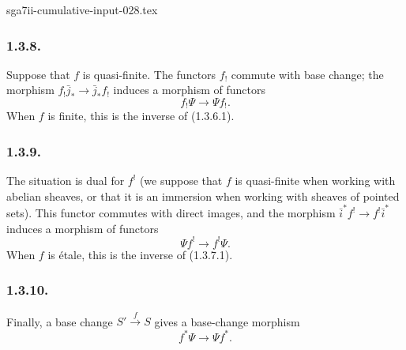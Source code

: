 \begin{filecontents*}{sga7ii-cumulative-input-028.tex}
\subsubsection*{1.3.8.}
Suppose that $f$ is quasi-finite.  The functors $f_!$ commute with base
change; the morphism
$f_!\bar j_*\longrightarrow\bar j_*f_!$ induces a morphism of
functors
\begin{equation}\tag{1.3.8.1}
f_!\Psi\longrightarrow\Psi f_!.
\end{equation}
When $f$ is finite, this is the inverse of (1.3.6.1).

\subsubsection*{1.3.9.}
The situation is dual for $f^!$ (we suppose that $f$ is quasi-finite
when working with abelian sheaves, or that it is an immersion when
working with sheaves of pointed sets).  This functor commutes with
direct images, and the morphism
$\bar i^*f^!\longrightarrow f^!\bar i^*$ induces a morphism of
functors
\begin{equation}\tag{1.3.9.1}
\Psi f^!\longrightarrow f^!\Psi.
\end{equation}
When $f$ is \'{e}tale, this is the inverse of (1.3.7.1).

\subsubsection*{1.3.10.}
Finally, a base change $S'\xrightarrow{f}S$ gives a base-change
morphism
\begin{equation}\tag{1.3.10.1}
f^*\Psi\longrightarrow\Psi f^*.
\end{equation}

\end{filecontents*}

